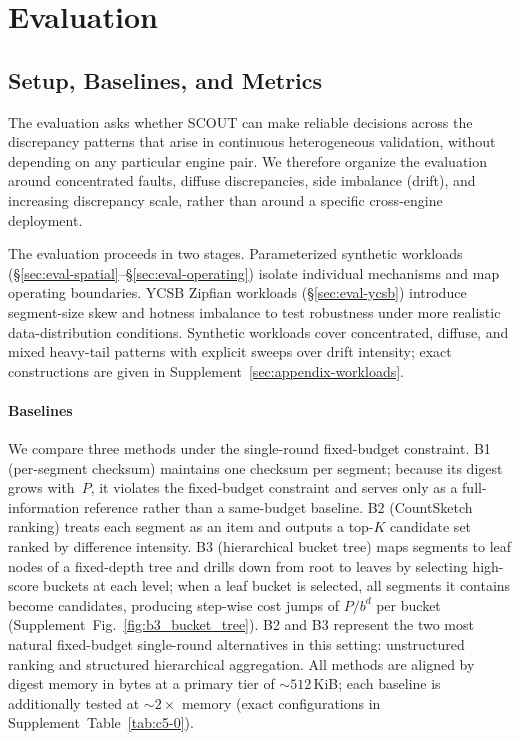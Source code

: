 \section{Evaluation}
\label{sec:evaluation}

\subsection{Setup, Baselines, and Metrics}
\label{sec:eval-method}

The evaluation asks whether SCOUT can make reliable decisions across the discrepancy patterns that arise in continuous heterogeneous validation, without depending on any particular
engine pair. We therefore organize the evaluation around concentrated faults, diffuse discrepancies, side imbalance (drift), and increasing discrepancy scale, rather than around a specific
cross-engine deployment.

The evaluation proceeds in two stages.
Parameterized synthetic workloads
(\S\ref{sec:eval-spatial}--\S\ref{sec:eval-operating})
isolate individual mechanisms and map operating boundaries.
YCSB Zipfian workloads (\S\ref{sec:eval-ycsb}) introduce
segment-size skew and hotness imbalance to test robustness
under more realistic data-distribution conditions.
Synthetic workloads cover concentrated, diffuse, and mixed
heavy-tail patterns with explicit sweeps over drift
intensity; exact constructions are given in
Supplement~\ref{sec:appendix-workloads}.

\paragraph{Baselines}
We compare three methods under the single-round fixed-budget
constraint.
B1 (per-segment checksum) maintains one checksum per segment;
because its digest grows with~$P$, it violates the
fixed-budget constraint and serves only as a full-information
reference rather than a same-budget baseline.
B2 (CountSketch ranking) treats each segment as an item and
outputs a top-$K$ candidate set ranked by difference intensity.
B3 (hierarchical bucket tree) maps segments to leaf nodes of a
fixed-depth tree and drills down from root to leaves by selecting
high-score buckets at each level; when a leaf bucket is selected,
all segments it contains become candidates, producing step-wise
cost jumps of $P/b^d$ per bucket
(Supplement~Fig.~\ref{fig:b3_bucket_tree}). B2 and B3 represent the two most natural fixed-budget single-round alternatives in this setting: unstructured ranking and structured hierarchical aggregation.
All methods are aligned by digest memory in bytes at a primary
tier of ${\sim}512$\,KiB; each baseline is additionally tested
at ${\sim}2{\times}$ memory
(exact configurations in Supplement~Table~\ref{tab:c5-0}).

